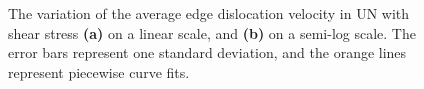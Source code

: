\documentclass[applsci,article,submit,pdftex,moreauthors]{Definitions/mdpi}
\newcommand{\?}{\stackrel{?}{=}}
\begin{document}
\begin{figure}[h!]
\centering
{}
\hfill
{}
\caption{The variation of the average edge dislocation velocity in UN with shear stress \textbf{(a)} on a linear scale, and \textbf{(b)} on a semi-log scale. The error bars represent one standard deviation, and the orange lines represent piecewise curve fits.}
\label{Fig:DislocPosTime}
\end{figure}
\end{document}
